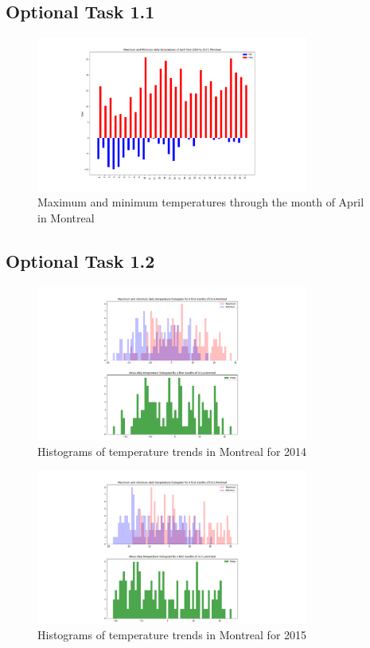 \documentclass[12pt]{article}
\begin{document}
\subsection{Optional Task 1.1}
\begin{figure}[!htbp]
\centering
\includegraphics[width=0.8\textwidth]{./docs/aprildaily.png} 
\caption{\scriptsize Maximum and minimum temperatures through the month of April in Montreal}
\label{Aprilmaxmin}		  
\end{figure}

\subsection{Optional Task 1.2}
\begin{figure}[!htbp]
\centering
\includegraphics[width=0.8\textwidth]{./docs/histogram2014.png} 
\caption{\scriptsize Histograms of temperature trends in Montreal for 2014}
\label{hist2014}		  
\end{figure}

\begin{figure}[!htbp]
\centering
\includegraphics[width=0.8\textwidth]{./docs/histogram2015.png} 
\caption{\scriptsize Histograms of temperature trends in Montreal for 2015}
\label{hist2015}		  
\end{figure}
\end{document}
